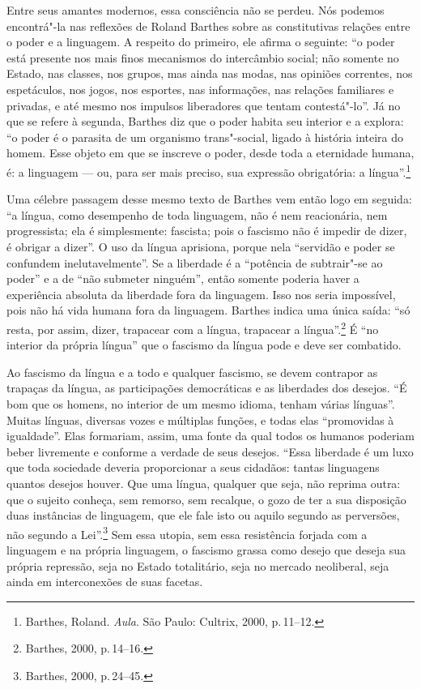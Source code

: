 Entre seus amantes modernos, essa consciência não se perdeu. Nós podemos
encontrá"-la nas reflexões de Roland Barthes sobre as constitutivas
relações entre o poder e a linguagem. A respeito do primeiro, ele afirma
o seguinte: ``o poder está presente nos mais finos mecanismos do
intercâmbio social; não somente no Estado, nas classes, nos grupos, mas
ainda nas modas, nas opiniões correntes, nos espetáculos, nos jogos, nos
esportes, nas informações, nas relações familiares e privadas, e até
mesmo nos impulsos liberadores que tentam contestá"-lo''. Já no que se
refere à segunda, Barthes diz que o poder habita seu interior e a
explora: ``o poder é o parasita de um organismo trans"-social, ligado à
história inteira do homem. Esse objeto em que se inscreve o poder, desde
toda a eternidade humana, é: a linguagem --- ou, para ser mais preciso,
sua expressão obrigatória: a língua''.\footnote{Barthes, Roland.
  \emph{Aula}. São Paulo: Cultrix, 2000, p.\,11--12.}

Uma célebre passagem desse mesmo texto de Barthes vem então logo em
seguida: ``a língua, como desempenho de toda linguagem, não é nem
reacionária, nem progressista; ela é simplesmente: fascista; pois o
fascismo não é impedir de dizer, é obrigar a dizer''. O uso da língua
aprisiona, porque nela ``servidão e poder se confundem
inelutavelmente''. Se a liberdade é a ``potência de subtrair"-se ao
poder'' e a de ``não submeter ninguém'', então somente poderia haver a
experiência absoluta da liberdade fora da linguagem. Isso nos seria
impossível, pois não há vida humana fora da linguagem. Barthes indica
uma única saída: ``só resta, por assim, dizer, trapacear com a língua,
trapacear a língua''.\footnote{Barthes, 2000, p.\,14--16.} É ``no interior
da própria língua'' que o fascismo da língua pode e deve ser combatido.

Ao fascismo da língua e a todo e qualquer fascismo, se devem contrapor
as trapaças da língua, as participações democráticas e as liberdades dos
desejos. ``É bom que os homens, no interior de um mesmo idioma, tenham
várias línguas''. Muitas línguas, diversas vozes e múltiplas funções, e
todas elas ``promovidas à igualdade''. Elas formariam, assim, uma fonte
da qual todos os humanos poderiam beber livremente e conforme a verdade
de seus desejos. ``Essa liberdade é um luxo que toda sociedade deveria
proporcionar a seus cidadãos: tantas linguagens quantos desejos houver.
Que uma língua, qualquer que seja, não reprima outra: que o sujeito
conheça, sem remorso, sem recalque, o gozo de ter a sua disposição duas
instâncias de linguagem, que ele fale isto ou aquilo segundo as
perversões, não segundo a Lei''.\footnote{Barthes, 2000, p.\,24--45.} Sem
essa utopia, sem essa resistência forjada com a linguagem e na própria
linguagem, o fascismo grassa como desejo que deseja sua própria
repressão, seja no Estado totalitário, seja no mercado neoliberal, seja
ainda em interconexões de suas facetas.

